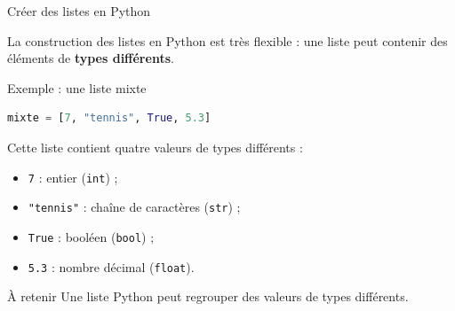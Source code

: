 \documentclass[10pt]{beamer}
\begin{document}
\begin{frame}[fragile]{Créer des listes en Python}

La construction des listes en Python est très flexible :
une liste peut contenir des éléments de \textbf{types différents}.

\begin{exampleblock}{Exemple : une liste mixte}
\begin{lstlisting}[language=Python]
mixte = [7, "tennis", True, 5.3]
\end{lstlisting}
\end{exampleblock}

Cette liste contient quatre valeurs de types différents :

\begin{itemize}
    \item \texttt{7} : entier (\texttt{int}) ;
    \item \texttt{"tennis"} : chaîne de caractères (\texttt{str}) ;
    \item \texttt{True} : booléen (\texttt{bool}) ;
    \item \texttt{5.3} : nombre décimal (\texttt{float}).
\end{itemize}

\begin{block}{À retenir}
Une liste Python peut regrouper des valeurs de types différents.
\end{block}

\end{frame}
\end{document}
